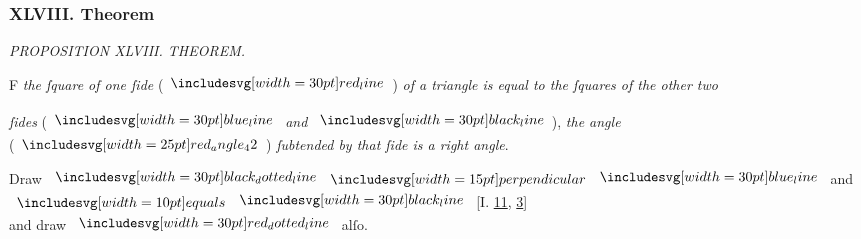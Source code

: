 \documentclass[11pt,preview]{standalone}
\begin{document}
\subsubsection{XLVIII. Theorem}

\begin{minipage}[t]{0.43\textwidth}
    \vspace{20pt}
    
\end{minipage}%
\hfill
\begin{minipage}[t]{0.54\textwidth}
    \begin{center}
        \textit{PROPOSITION XLVIII. THEOREM.}\label{book1pr48} \\
    \end{center}

    \hfill

    \begin{center}
        \raggedright \lettrine[lines=3, loversize=1, nindent=0pt]{}{}F \textit{the ſquare of one ſide} (\hspace{-1ex}$\redline$\hspace{-1ex}) \textit{of a triangle is equal to the ſquares of the other two}
    \end{center}
    \raggedright \textit{ſides} (\hspace{-1ex}$\blueline$ \textit{and} $\blackline$\hspace{-1ex}), \textit{the angle}\\ (\hspace{-1ex}$\img{red_angle_42}$\hspace{-1ex}) \textit{ſubtended by that ſide is a right angle}.
\end{minipage}%

\hfill

{\vspace{1ex}\begin{center}
        Draw $\dottedblackline \bperp \blueline$ and $\bequals \blackline$ [\textsc{I.} \hyperref[book1pr11]{11}, \hyperref[book1pr3]{3}]\\
        and draw $\dottedredline$ alſo.
    \end{center}}
\end{document}
